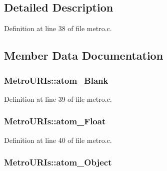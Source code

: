 \subsection{Detailed Description}


Definition at line 38 of file metro.\+c.



\subsection{Member Data Documentation}
\subsubsection[{\texorpdfstring{atom\+\_\+\+Blank}{atom_Blank}}]{ Metro\+U\+R\+Is\+::atom\+\_\+\+Blank}\hypertarget{struct_metro_u_r_is_a1f4ba7ae215de8c0c56e93d233b3bbbf}{}\label{struct_metro_u_r_is_a1f4ba7ae215de8c0c56e93d233b3bbbf}


Definition at line 39 of file metro.\+c.

\subsubsection[{\texorpdfstring{atom\+\_\+\+Float}{atom_Float}}]{ Metro\+U\+R\+Is\+::atom\+\_\+\+Float}\hypertarget{struct_metro_u_r_is_a1d777756e182145071e0b2dabcef3196}{}\label{struct_metro_u_r_is_a1d777756e182145071e0b2dabcef3196}


Definition at line 40 of file metro.\+c.

\subsubsection[{\texorpdfstring{atom\+\_\+\+Object}{atom_Object}}]{ Metro\+U\+R\+Is\+::atom\+\_\+\+Object}\hypertarget{struct_metro_u_r_is_a4b2184441fd87fa4ab946c09d934bfe6}{}\label{struct_metro_u_r_is_a4b2184441fd87fa4ab946c09d934bfe6}


